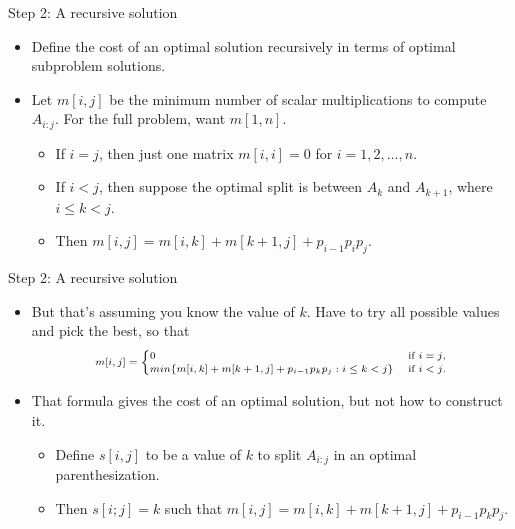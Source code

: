 \documentclass{beamer}
\begin{document}
\begin{frame}{Step 2: A recursive solution}
    \begin{itemize}
        \item Define the cost of an optimal solution recursively in terms of optimal subproblem solutions.
        \item Let $m[i, j]$ be the minimum number of scalar multiplications to compute $A_{i:j}$. For the full problem, want $m[1, n]$.
        \begin{itemize}
            \item If $i = j$, then just one matrix $ m[i, i] = 0$ for $i = 1, 2, \ldots, n$.
            \item If $i < j$, then suppose the optimal split is between $A_k$ and $A_{k+1}$, where $i \leq k < j$.
            \item Then $m[i, j] = m[i, k] + m[k+1, j] + p_{i-1} p_i p_j$.
        \end{itemize}
    \end{itemize}
\end{frame}

\begin{frame}{Step 2: A recursive solution}
    \begin{itemize}
        \item But that's assuming you know the value of $k$. Have to try all possible values and pick the best, so that
            \begin{equation*}
                \scriptsize
                \begin{align*}
                    m[i, j] =
                        \begin{cases}
                            0 & \text{ if } i = j \text{,} \\
                            min \{ m[i, k] + m[k+1, j] + p_{i-1} p_k p_j : i \leq k < j \} & \text{ if } i < j \text{.}
                        \end{cases}
                \end{align*}
            \end{equation*}
        \item That formula gives the cost of an optimal solution, but not how to construct it.
            \begin{itemize}
                \item Deﬁne $s[i, j]$ to be a value of $k$ to split $A_{i:j}$ in an optimal parenthesization.
                \item Then $s[i; j] = k$ such that $m[i, j] = m[i, k] + m[k+1, j] + p_{i-1} p_k p_j$.
            \end{itemize}
    \end{itemize}
\end{frame}
\end{document}
